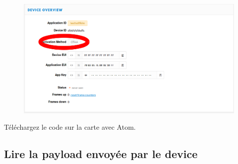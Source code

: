 \documentclass{article}
\begin{document}
 
  \begin{figure}[H]
\begin{center}
\advance\leftskip-3cm
\advance\rightskip-3cm
\includegraphics[keepaspectratio=true,scale=0.4]{device_overview.png}

\label{visina8}
\end{center}\end{figure}
 
 
Téléchargez le code sur la carte avec Atom. 
    
    
    \subsection{Lire la payload envoyée par le device}
    
\end{document}
